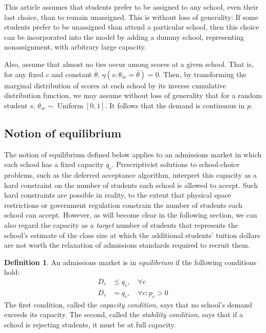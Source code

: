 \documentclass[12pt]{article}
\theoremstyle{definition}
\newtheorem{definition}{Definition}
\begin{document}
This article assumes that students prefer to be assigned to any school, even their last choice, than to remain unassigned. This is without loss of generality: If some students prefer to be unassigned than attend a particular school, then this choice can be incorporated into the model by adding a dummy school, representing nonassignment, with arbitrary large capacity.

Also, assume that almost no ties occur among scores at a given school. That is, for any fixed $c$ and constant $\bar \theta$, $\eta( s: \theta_{sc} = \bar \theta) = 0$. Then, by transforming the marginal distribution of scores at each school by its inverse cumulative distribution function, we may assume without loss of generality that for a random student $s$, $\theta_{sc} \sim \operatorname{Uniform}[0, 1]$. It follows that the demand is continuous in $p$. 

\subsection{Notion of equilibrium}
The notion of equilibrium defined below applies to an admissions market in which each school has a fixed capacity $q_c$. Prescriptivist solutions to school-choice problems, such as the deferred acceptance algorithm, interpret this capacity as a hard constraint on the number of students each school is allowed to accept. Such hard constraints are possible in reality, to the extent that physical space restrictions or government regulation constrain the number of students each school can accept. However, as will become clear in the following section, we can also regard the capacity as a \emph{target} number of students that represents the school's estimate of the class size at which the additional students' tuition dollars are not worth the relaxation of admissions standards required to recruit them.

\begin{definition} \label{marketeqconditions} An admissions market is in \emph{equilibrium} if the following conditions hold:
\begin{align} D_c &\leq q_c, \quad \forall c \label{capacitycondition} \\
D_c &= q_c, \quad \forall c: p_c > 0 \label{stabilitycondition}
\end{align}
The first condition, called the \emph{capacity condition,} says that no school's demand exceeds its capacity. The second, called the \emph{stability condition,} says that if a school is rejecting students, it must be at full capacity.
\end{definition}
\end{document}
